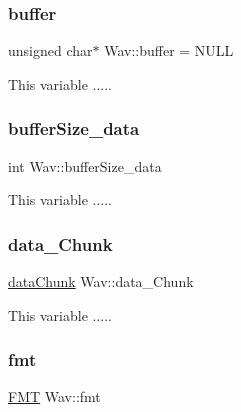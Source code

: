 \subsubsection{\texorpdfstring{buffer}{buffer}}
{\footnotesize\ttfamily unsigned char$\ast$ Wav\+::buffer = N\+U\+LL\hspace{0.3cm}{\ttfamily [protected]}}



This variable ..... 

\mbox{\label{classWav_aaa1fc130f301f39cc74091dfb9750d13}} 
\subsubsection{\texorpdfstring{buffer\+Size\+\_\+data}{bufferSize\_data}}
{\footnotesize\ttfamily int Wav\+::buffer\+Size\+\_\+data\hspace{0.3cm}{\ttfamily [protected]}}



This variable ..... 

\mbox{\label{classWav_ad56011c7baf92b85b81483d7ef8b58ef}} 
\subsubsection{\texorpdfstring{data\+\_\+\+Chunk}{data\_Chunk}}
{\footnotesize\ttfamily \hyperlink{structdataChunk}{data\+Chunk} Wav\+::data\+\_\+\+Chunk\hspace{0.3cm}{\ttfamily [protected]}}



This variable ..... 

\mbox{\label{classWav_a2d8b662300b2821186951e428da6a6a9}} 
\subsubsection{\texorpdfstring{fmt}{fmt}}
{\footnotesize\ttfamily \hyperlink{structFMT}{F\+MT} Wav\+::fmt\hspace{0.3cm}{\ttfamily [protected]}}



